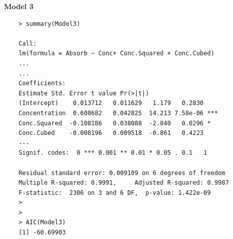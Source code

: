 \documentclass[a4paper,12pt]{article}
\begin{document}
\newpage
\begin{framed}
	\noindent \textbf{Model 3}
	\begin{verbatim}
	> summary(Model3)
	
	Call:
	lm(formula = Absorb ~ Conc+ Conc.Squared + Conc.Cubed)
	...
	...
	Coefficients:
	Estimate Std. Error t value Pr(>|t|)
	(Intercept)    0.013712   0.011629   1.179   0.2830
	Concentration  0.608682   0.042825  14.213 7.58e-06 ***
	Conc.Squared  -0.108186   0.038088  -2.840   0.0296 *
	Conc.Cubed    -0.008196   0.009518  -0.861   0.4223
	---
	Signif. codes:  0 *** 0.001 ** 0.01 * 0.05 . 0.1   1
	
	Residual standard error: 0.009109 on 6 degrees of freedom
	Multiple R-squared: 0.9991,     Adjusted R-squared: 0.9987
	F-statistic:  2306 on 3 and 6 DF,  p-value: 1.422e-09
	>
	>
	> AIC(Model3)
	[1] -60.69903
	\end{verbatim}
\end{framed}
\newpage

%
%
\end{document}
